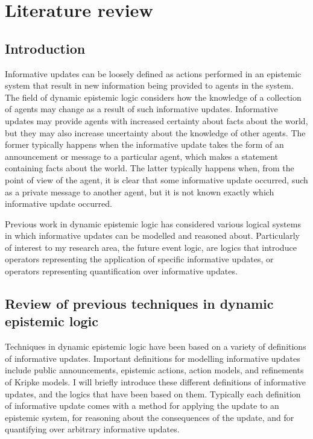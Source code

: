 \chapter{Literature review}

\section{Introduction}

Informative updates can be loosely defined as actions performed in an epistemic
system that result in new information being provided to agents in the system.
The field of dynamic epistemic logic considers how the knowledge of a collection
of agents may change as a result of such informative updates. Informative
updates may provide agents with increased certainty about facts about the world,
but they may also increase uncertainty about the knowledge of other agents. The
former typically happens when the informative update takes the form of an
announcement or message to a particular agent, which makes a statement
containing facts about the world. The latter typically happens when, from the
point of view of the agent, it is clear that some informative update occurred,
such as a private message to another agent, but it is not known exactly which
informative update occurred.

Previous work in dynamic epistemic logic has considered various logical systems
in which informative updates can be modelled and reasoned about. Particularly of
interest to my research area, the future event logic, are logics that introduce
operators representing the application of specific informative updates, or
operators representing quantification over informative updates.

\section{Review of previous techniques in dynamic epistemic logic}

Techniques in dynamic epistemic logic have been based on a variety of
definitions of informative updates. Important definitions for modelling
informative updates include public announcements, epistemic actions, action
models, and refinements of Kripke models. I will briefly introduce these
different definitions of informative updates, and the logics that have been
based on them. Typically each definition of informative update comes with a
method for applying the update to an epistemic system, for reasoning about the
consequences of the update, and for quantifying over arbitrary informative
updates.

